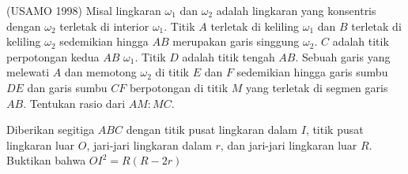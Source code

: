 \documentclass[11pt]{scrartcl}
\begin{document}
\begin{problem}
    (USAMO 1998) Misal lingkaran $\omega_1$ dan $\omega_2$ adalah lingkaran yang konsentris dengan $\omega_2$ terletak di interior $\omega_1$. Titik $A$ terletak di keliling $\omega_1$ dan $B$ terletak di keliling $\omega_2$ sedemikian hingga $AB$ merupakan garis singgung $\omega_2$. $C$ adalah titik perpotongan kedua $AB$ $\omega_1$. Titik $D$ adalah titik tengah $AB$. Sebuah garis yang melewati $A$ dan memotong $\omega_2$ di titik $E$ dan $F$ sedemikian hingga garis sumbu $DE$ dan garis sumbu $CF$ berpotongan di titik $M$ yang terletak di segmen garis $AB$. Tentukan rasio dari $AM:MC$.
\end{problem}

\begin{problem}
    Diberikan segitiga $ABC$ dengan titik pusat lingkaran dalam $I$, titik pusat lingkaran luar $O$, jari-jari lingkaran dalam $r$, dan jari-jari lingkaran luar $R$. Buktikan bahwa $OI^2 = R(R - 2r)$
\end{problem}
\end{document}
